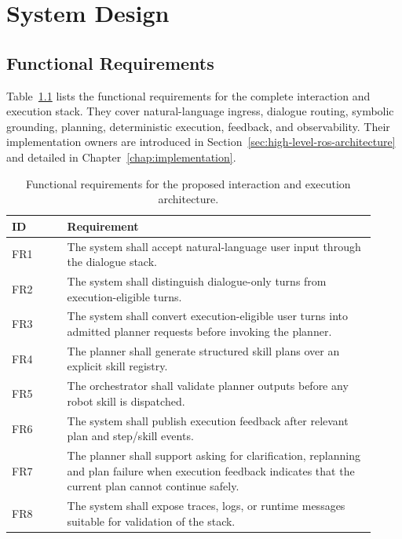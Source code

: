 \chapter{System Design}
\label{chap:architecture-requirements}

\section{Functional Requirements}

Table~\ref{tab:functional-requirements} lists the functional requirements for the complete interaction and execution stack. They cover natural-language ingress, dialogue routing, symbolic grounding, planning, deterministic execution, feedback, and observability. Their implementation owners are introduced in Section~\ref{sec:high-level-ros-architecture} and detailed in Chapter~\ref{chap:implementation}.

\begin{table}[H] \centering \small \begin{tabular}{p{0.14\linewidth}p{0.78\linewidth}} \toprule \textbf{ID} & \textbf{Requirement}\\ \midrule FR1 & The system shall accept natural-language user input through the dialogue stack.\\
FR2 & The system shall distinguish dialogue-only turns from execution-eligible turns.\\
FR3 & The system shall convert execution-eligible user turns into admitted planner requests before invoking the planner.\\
FR4 & The planner shall generate structured skill plans over an explicit skill registry.\\
FR5 & The orchestrator shall validate planner outputs before any robot skill is dispatched.\\
FR6 & The system shall publish execution feedback after relevant plan and step/skill events.\\
FR7 & The planner shall support asking for clarification, replanning and plan failure when execution feedback indicates that the current plan cannot continue safely.\\
FR8 & The system shall expose traces, logs, or runtime messages suitable for validation of the stack.\\
\bottomrule \end{tabular} \caption{Functional requirements for the proposed interaction and execution architecture.} \label{tab:functional-requirements} \end{table}

